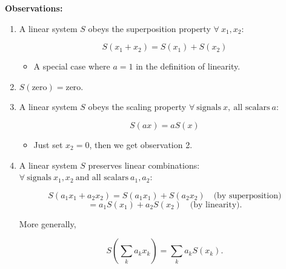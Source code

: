     \begin{intuition}
        \textbf{Observations:}
        \begin{enumerate}
            \item  A linear system \( S \) obeys the superposition property \( \forall \ x_1, x_2 \):

            \[
            S(x_1 + x_2) = S(x_1) + S(x_2)
            \]
    
            \begin{itemize}
                \item A special case where \( a = 1 \) in the definition of linearity.
            \end{itemize}

            \item \( S(\text{zero}) = \text{zero} \).
    
            \item A linear system \( S \) obeys the scaling property \( \forall \ \text{signals} \ x, \ \text{all scalars} \ a \):
    
            \[
            S(a x) = a S(x)
            \]
    
            \begin{itemize}
                \item Just set \( x_2 = 0 \), then we get observation 2.
            \end{itemize}
    
            \item A linear system \( S \) preserves linear combinations: \( \forall \ \text{signals} \ x_1, x_2 \ \text{and all scalars} \ a_1, a_2 \):
    
            \[
            S(a_1 x_1 + a_2 x_2) = S(a_1 x_1) + S(a_2 x_2) \quad \text{(by superposition)}
            \]
            \[
            = a_1 S(x_1) + a_2 S(x_2) \quad \text{(by linearity)}.
            \]
    
            More generally,
    
            \[
            S\left( \sum_k a_k x_k \right) = \sum_k a_k S(x_k).
            \]
        \end{enumerate}
    \end{intuition}

    \begin{example}

    \end{example}

    
